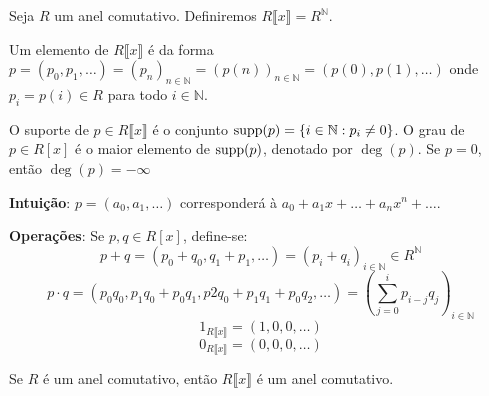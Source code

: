 \begin{definition}
Seja $R$ um anel comutativo. Definiremos $R\llbracket x\rrbracket=R^{\mathbb N}$.


Um elemento de $R\llbracket x\rrbracket$ é da forma $p=(p_0, p_1, \dots)=(p_n)_{n \in \mathbb N}=(p(n))_{n \in \mathbb N}=(p(0), p(1), \dots)$ onde $p_i=p(i)\in R$  para todo $i \in \mathbb N$.

O suporte de $p\in R\llbracket x\rrbracket$ é o conjunto $\operatorname{supp}(p)=\{i \in \mathbb N: p_i \neq 0\}$.
O grau de $p \in R[x]$ é o maior elemento de $\operatorname{supp}(p)$, denotado por $\deg(p)$. Se $p=0$, então $\deg(p)=-\infty$

\textbf{Intuição}: $p=(a_0, a_1, \dots)$ corresponderá à $a_0+a_1x+\dots+a_n x^n+\dots$.

\textbf{Operações}:
Se $p, q \in R[x]$, define-se:
$$p+q=(p_0+q_0, q_1+p_1, \dots)=(p_i+q_i)_{i \in \mathbb N}\in R^{\mathbb N}$$
$$p\cdot q=(p_0q_0, p_1q_0+p_0q_1, p2q_0+p_1q_1+p_0q_2, \dots)=\left(\sum_{j=0}^i p_{i-j}q_j\right)_{i \in \mathbb N}$$
$$1_{R\llbracket x\rrbracket}=(1, 0, 0, \dots)$$
$$0_{R\llbracket x\rrbracket}=(0, 0, 0, \dots)$$
\end{definition}

\begin{lemma}
    Se $R$ é um anel comutativo, então $R\llbracket x \rrbracket$ é um anel comutativo.
\end{lemma}


